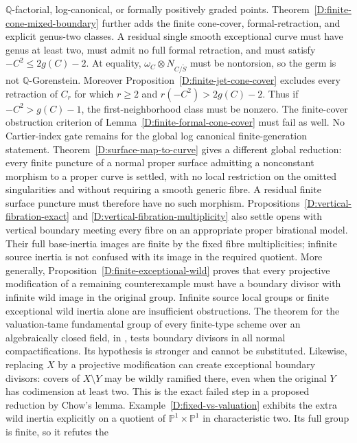 \begin{remark}
$\mathbb Q$-factorial, log-canonical, or formally positively graded
points.  Theorem~\ref{D:finite-cone-mixed-boundary} further adds
the finite cone-cover, formal-retraction, and explicit genus-two
classes.  A residual single smooth exceptional curve must have
genus at least two, must admit no full formal retraction, and
must satisfy $-C^2\leq2g(C)-2$.  At equality,
$\omega_C\otimes N_{C/\widetilde S}$ must be nontorsion, so the
germ is not $\mathbb Q$-Gorenstein.  Moreover
Proposition~\ref{D:finite-jet-cone-cover} excludes every retraction
of $C_r$ for which $r\geq2$ and $r(-C^2)>2g(C)-2$.
Thus if $-C^2>g(C)-1$, the first-neighborhood class must be
nonzero.  The finite-cover obstruction criterion of
Lemma~\ref{D:finite-formal-cone-cover} must fail as well.  No Cartier-index gate remains for the global log canonical
finite-generation statement.
Theorem~\ref{D:surface-map-to-curve} gives a different global
reduction: every finite puncture of a normal proper surface
admitting a nonconstant morphism to a proper curve is settled,
with no local restriction on the omitted singularities and
without requiring a smooth generic fibre.  A residual finite
surface puncture must therefore have no such morphism.
Propositions~\ref{D:vertical-fibration-exact} and
\ref{D:vertical-fibration-multiplicity} also settle opens with
vertical boundary meeting every fibre on an appropriate proper
birational model.  Their full base-inertia images are finite
by the fixed fibre multiplicities; infinite source inertia is
not confused with its image in the required quotient.
More generally,
Proposition~\ref{D:finite-exceptional-wild} proves that every
projective modification of a remaining counterexample must have
a boundary divisor with infinite wild image in the original
group.  Infinite source local groups or finite exceptional wild
inertia alone are insufficient obstructions.
The theorem for the valuation-tame fundamental group of every finite-type
scheme over an algebraically closed field, in
\cite[section 2.6]{AHLS2026}, tests boundary divisors in all normal
compactifications. Its hypothesis is stronger and cannot be substituted.
Likewise, replacing $X$ by a projective modification can create
exceptional boundary divisors: covers of $X\setminus Y$ may be wildly
ramified there, even when the original $Y$ has codimension at least two.
This is the exact failed step in a proposed reduction by Chow's lemma.
Example~\ref{D:fixed-vs-valuation} exhibits the extra wild inertia
explicitly on a quotient of $\mathbb P^1\times\mathbb P^1$ in
characteristic two. Its full group is finite, so it refutes the

\end{remark}
